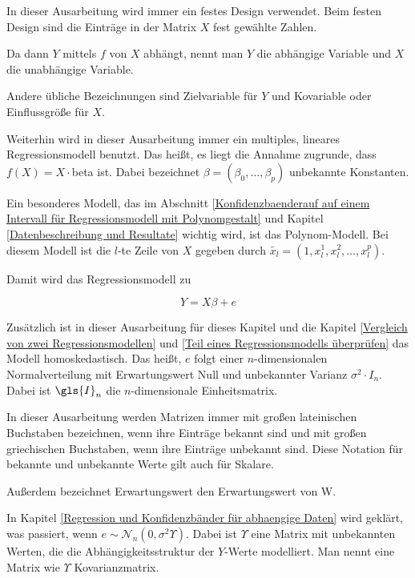 \documentclass[12pt,a4paper]{article}
\theoremstyle{definition}
\theoremstyle{definition}
\theoremstyle{definition}
\theoremstyle{definition}
\begin{document}
In dieser Ausarbeitung wird immer ein festes Design verwendet. Beim festen Design sind die Einträge in der Matrix $X$ fest gewählte Zahlen.

Da dann $Y$ mittels $f$ von $X$ abhängt, nennt man $Y$ die abhängige Variable und $X$ die unabhängige Variable. 

Andere übliche Bezeichnungen sind Zielvariable für $Y$ und Kovariable oder Einflussgröße für $X$.

Weiterhin wird in dieser Ausarbeitung immer ein multiples, lineares Regressionsmodell benutzt. Das heißt, es liegt die Annahme zugrunde, dass $f(X) = X \cdot $\gls{beta} ist. Dabei bezeichnet $\beta = (\beta_{0}, \ldots, \beta_{p})$ unbekannte Konstanten. 

Ein besonderes Modell, das im Abschnitt \ref{Konfidenzbaenderauf auf einem Intervall für Regressionsmodell mit Polynomgestalt} und Kapitel \ref{Datenbeschreibung und Resultate} wichtig wird, ist das Polynom-Modell. Bei diesem Modell ist die $l$-te Zeile von $X$ gegeben durch $\tilde{x_l} = (1, x_{l}^1, x_{l}^2, \ldots, x_{l}^p)$.

Damit wird das Regressionsmodell zu

\begin{equation}
Y = X \beta + e \label{Grundmodell_Regression}
\end{equation}

Zusätzlich ist in dieser Ausarbeitung für dieses Kapitel und die Kapitel \ref{Vergleich von zwei Regressionsmodellen} und \ref{Teil eines Regressionsmodells überprüfen} das Modell homoskedastisch. Das heißt, $e$ folgt einer $n$-dimensionalen Normalverteilung mit Erwartungswert Null und unbekannter Varianz $\sigma^2 \cdot I_n$. Dabei ist $\gls{I}_n$ die $n$-dimensionale Einheitsmatrix. 

In dieser Ausarbeitung werden \gls{Matrizen} immer mit großen lateinischen Buchstaben bezeichnen, wenn ihre Einträge bekannt sind und mit großen griechischen Buchstaben, wenn ihre Einträge unbekannt sind. Diese Notation für bekannte und unbekannte Werte gilt auch für Skalare. 

Außerdem bezeichnet \gls{Erwartungswert} den Erwartungswert von W.

In Kapitel \ref{Regression und Konfidenzbänder für abhaengige Daten} wird geklärt, was passiert, wenn $e \sim \mathscr{N}_{n}(0,\sigma^2 \Upsilon)$. Dabei ist $\Upsilon$ eine Matrix mit unbekannten Werten, die die Abhängigkeitsstruktur der $Y$-Werte modelliert. Man nennt eine Matrix wie $\Upsilon$ Kovarianzmatrix.
\end{document}
